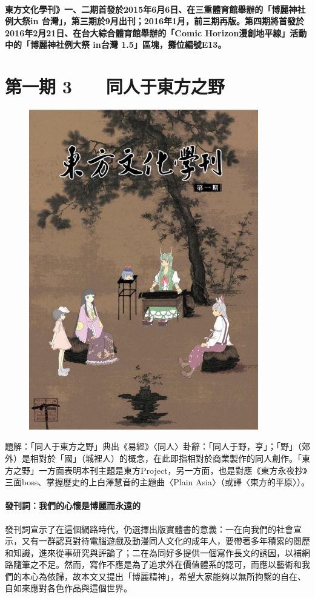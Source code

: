 \documentclass[UTF8,12pt,a4paper]{article}
\begin{document}
\paragraph{東方文化學刊》一、二期首發於2015年6月6日、在三重體育館舉辦的「博麗神社例大祭in 台灣」，第三期於9月出刊；2016年1月，前三期再版。第四期將首發於2016年2月21日、在台大綜合體育館舉辦的「Comic Horizon漫創地平線」活動中的「博麗神社例大祭 in台灣 1.5」區塊，攤位編號E13。}
\newpage

\section{第一期 3　　同人于東方之野}
\begin{figure}[ht]
    \begin{center}
        \includegraphics[width=10cm]{photo/1.jpg}
    \end{center}
\end{figure}
{題解：「同人于東方之野」典出《易經》〈同人〉卦辭：「同人于野，亨」；「野」（郊外）是相對於「國」（城裡人）的概念，在此即指相對於商業製作的同人創作。「東方之野」一方面表明本刊主題是東方Project，另一方面，也是對應《東方永夜抄》三面boss、掌握歷史的上白澤慧音的主題曲〈Plain Asia〉（或譯〈東方的平原〉）。}\\
\paragraph{\bf 發刊詞：我們的心懷是博麗而永遠的}

{發刊詞宣示了在這個網路時代，仍選擇出版實體書的意義：一在向我們的社會宣示，又有一群認真對待電腦遊戲及動漫同人文化的成年人，要帶著多年積累的閱歷和知識，進來從事研究與評論了；二在為同好多提供一個寫作長文的誘因，以補網路隨筆之不足。然而，寫作不應是為了追求外在價值體系的認可，而應以藝術和我們的本心為依歸，故本文又提出「博麗精神」，希望大家能夠以無所拘繫的自在、自如來應對各色作品與這個世界。}
\end{document}
